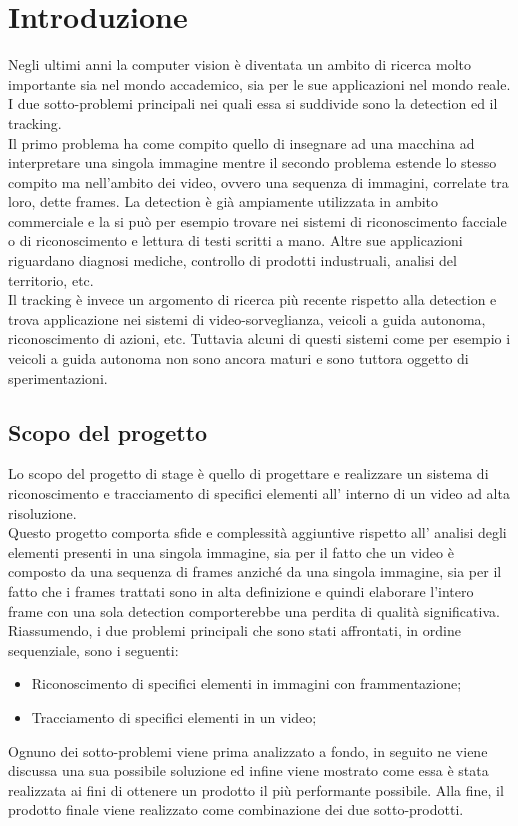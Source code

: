 \section{Introduzione}
Negli ultimi anni la computer vision è diventata un ambito di ricerca molto importante sia nel mondo accademico, sia per le sue applicazioni nel mondo reale. I due sotto-problemi principali nei quali essa si suddivide sono la detection ed il tracking.\\
Il primo problema ha come compito quello di insegnare ad una macchina ad interpretare una singola immagine mentre il secondo problema estende lo stesso compito ma nell'ambito dei video, ovvero una sequenza di immagini, correlate tra loro, dette frames. La detection è già ampiamente utilizzata in ambito commerciale e la si può per esempio trovare nei sistemi di riconoscimento facciale o di riconoscimento e lettura di testi scritti a mano. Altre sue applicazioni riguardano diagnosi mediche, controllo di prodotti industruali, analisi del territorio, etc.\\ 
Il tracking è invece un argomento di ricerca più recente rispetto alla detection e trova applicazione nei sistemi di video-sorveglianza, veicoli a guida autonoma, riconoscimento di azioni, etc. Tuttavia alcuni di questi sistemi come per esempio i veicoli a guida autonoma non sono ancora maturi e sono tuttora oggetto di sperimentazioni.
\subsection{Scopo del progetto}
Lo scopo del progetto di stage è quello di progettare e realizzare un sistema di riconoscimento e tracciamento di specifici elementi all' interno di un video ad alta risoluzione.\\
Questo progetto comporta sfide e complessità aggiuntive rispetto all' analisi degli elementi presenti in una singola immagine, sia per il fatto che un video è composto da una sequenza di frames anziché da una singola immagine, sia per il fatto che i frames trattati sono in alta definizione e quindi elaborare l'intero frame con una sola detection comporterebbe una perdita di qualità significativa.\\
Riassumendo, i due problemi principali che sono stati affrontati, in ordine sequenziale, sono i seguenti:
\begin{itemize}
\item Riconoscimento di specifici elementi in immagini con frammentazione;
\item Tracciamento di specifici elementi in un video;
\end{itemize}
Ognuno dei sotto-problemi viene prima analizzato a fondo, in seguito ne viene discussa una sua possibile soluzione ed infine viene mostrato come essa è stata realizzata ai fini di ottenere un prodotto il più performante possibile.
Alla fine, il prodotto finale viene realizzato come combinazione dei due sotto-prodotti.

